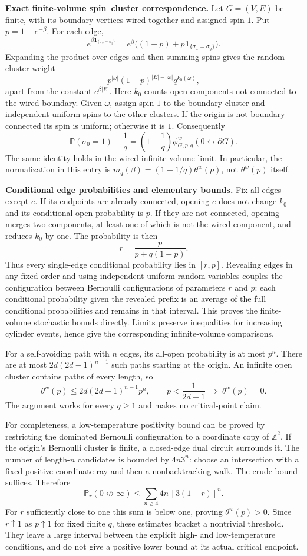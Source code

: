 \documentclass[11pt]{article}
\begin{document}
\textbf{Exact finite-volume spin--cluster correspondence.}
Let $G=(V,E)$ be finite, with its boundary vertices wired together and assigned
spin $1$.  Put $p=1-e^{-\beta}$.  For each edge,
\[
 e^{\beta\mathbf1_{\{\sigma_x=\sigma_y\}}}
 =e^\beta\bigl((1-p)+p\mathbf1_{\{\sigma_x=\sigma_y\}}\bigr).
\]
Expanding the product over edges and then summing spins gives the
random-cluster weight
\[
 p^{|\omega|}(1-p)^{|E|-|\omega|}q^{k_0(\omega)},
\]
apart from the constant $e^{\beta|E|}$.  Here $k_0$ counts open components not
connected to the wired boundary.  Given $\omega$, assign spin $1$ to the
boundary cluster and independent uniform spins to the other clusters.
If the origin is not boundary-connected its spin is uniform; otherwise it is
$1$.  Consequently
\[
 \mathbb P(\sigma_0=1)-\frac1q
 =\left(1-\frac1q\right)\phi^w_{G,p,q}(0\leftrightarrow\partial G).
\]
The same identity holds in the wired infinite-volume limit.  In particular,
the normalization in this entry is
$m_q(\beta)=(1-1/q)\theta^w(p)$, not $\theta^w(p)$ itself.

\textbf{Conditional edge probabilities and elementary bounds.}
Fix all edges except $e$.  If its endpoints are already connected, opening
$e$ does not change $k_0$ and its conditional open probability is $p$.
If they are not connected, opening merges two components, at least one of
which is not the wired component, and reduces $k_0$ by one.  The probability
is then
\[
 r=\frac{p}{p+q(1-p)}.
\]
Thus every single-edge conditional probability lies in $[r,p]$.
Revealing edges in any fixed order and using independent uniform random
variables couples the configuration between Bernoulli configurations of
parameters $r$ and $p$: each conditional probability given the revealed
prefix is an average of the full conditional probabilities and remains in
that interval.  This proves the finite-volume stochastic bounds directly.
Limits preserve inequalities for increasing cylinder events, hence give the
corresponding infinite-volume comparisons.

For a self-avoiding path with $n$ edges, its all-open probability is at most
$p^n$.  There are at most $2d(2d-1)^{n-1}$ such paths starting at the origin.
An infinite open cluster contains paths of every length, so
\[
 \theta^w(p)\leq 2d(2d-1)^{n-1}p^n,
 \qquad p<\frac1{2d-1}\ \Longrightarrow\ \theta^w(p)=0.
\]
The argument works for every $q\geq1$ and makes no critical-point claim.

For completeness, a low-temperature positivity bound can be proved by
restricting the dominated Bernoulli configuration to a coordinate copy of
$\mathbb Z^2$.  If the origin's Bernoulli cluster is finite, a closed-edge
dual circuit surrounds it.  The number of length-$n$ candidates is bounded
by $4n3^n$: choose an intersection with a fixed positive coordinate ray and
then a nonbacktracking walk.  The crude bound suffices.  Therefore
\[
 \mathbb P_r(0\not\leftrightarrow\infty)
 \leq\sum_{n\geq4}4n\,[3(1-r)]^n.
\]
For $r$ sufficiently close to one this sum is below one, proving
$\theta^w(p)>0$.  Since $r\uparrow1$ as $p\uparrow1$ for fixed finite $q$,
these estimates bracket a nontrivial threshold.  They leave a large interval
between the explicit high- and low-temperature conditions, and do not give
a positive lower bound at its actual critical endpoint.
\end{document}
